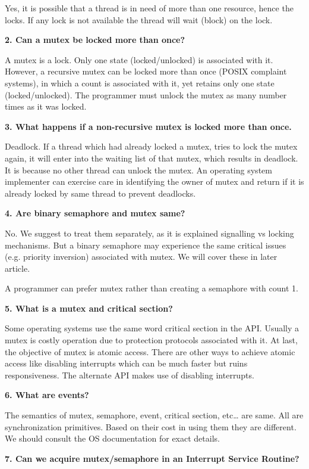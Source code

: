 \documentclass[8pt,landscape]{article}
\begin{document}
\begin{multicols}{3}
\begin{tiny}
Yes, it is possible that a thread is in need of more than one resource, hence the locks. If any lock is not available the thread will wait (block) on the lock.

\textbf{2. Can a mutex be locked more than once?}

A mutex is a lock. Only one state (locked/unlocked) is associated with it. However, a recursive mutex can be locked more than once (POSIX complaint systems), in which a count is associated with it, yet retains only one state (locked/unlocked). The programmer must unlock the mutex as many number times as it was locked.

\textbf{3. What happens if a non-recursive mutex is locked more than once.}

Deadlock. If a thread which had already locked a mutex, tries to lock the mutex again, it will enter into the waiting list of that mutex, which results in deadlock. It is because no other thread can unlock the mutex. An operating system implementer can exercise care in identifying the owner of mutex and return if it is already locked by same thread to prevent deadlocks.

\textbf{4. Are binary semaphore and mutex same?}

No. We suggest to treat them separately, as it is explained signalling vs locking mechanisms. But a binary semaphore may experience the same critical issues (e.g. priority inversion) associated with mutex. We will cover these in later article.

A programmer can prefer mutex rather than creating a semaphore with count 1.

\textbf{5. What is a mutex and critical section?}

Some operating systems use the same word critical section in the API. Usually a mutex is costly operation due to protection protocols associated with it. At last, the objective of mutex is atomic access. There are other ways to achieve atomic access like disabling interrupts which can be much faster but ruins responsiveness. The alternate API makes use of disabling interrupts.

\textbf{6. What are events?}

The semantics of mutex, semaphore, event, critical section, etc… are same. All are synchronization primitives. Based on their cost in using them they are different. We should consult the OS documentation for exact details.

\textbf{7. Can we acquire mutex/semaphore in an Interrupt Service Routine?}


\end{tiny}
\end{multicols}
\end{document}
